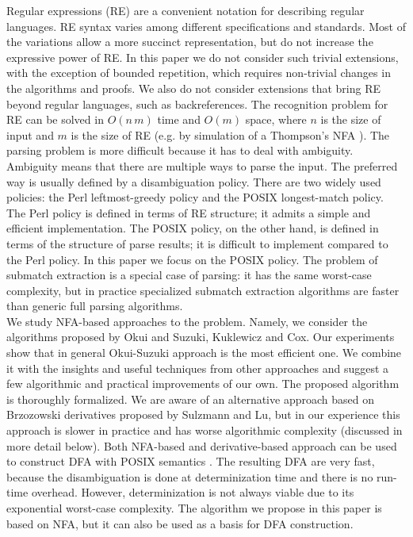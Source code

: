 \documentclass[AMA,STIX1COL]{WileyNJD-v2}
\begin{document}
Regular expressions (RE) are a convenient notation for describing regular languages.
RE syntax varies among different specifications and standards.
Most of the variations allow a more succinct representation, but do not increase the expressive power of RE.
In this paper we do not consider such trivial extensions, with the exception of bounded repetition,
which requires non-trivial changes in the algorithms and proofs.
We also do not consider extensions that bring RE beyond regular languages, such as backreferences.
%
The recognition problem for RE can be solved in $O(n \, m)$ time and $O(m)$ space,
where $n$ is the size of input and $m$ is the size of RE
(e.g. by simulation of a Thompson's NFA \cite{Tho68} \cite{ALSU07}).
The parsing problem is more difficult because it has to deal with ambiguity.
Ambiguity means that there are multiple ways to parse the input.
The preferred way is usually defined by a disambiguation policy.
There are two widely used policies: the Perl leftmost-greedy policy and the POSIX longest-match policy.
The Perl policy is defined in terms of RE structure; it admits a simple and efficient implementation.
The POSIX policy, on the other hand, is defined in terms of the structure of parse results;
it is difficult to implement compared to the Perl policy.
In this paper we focus on the POSIX policy.
%
The problem of submatch extraction is a special case of parsing: it has the same worst-case complexity,
but in practice specialized submatch extraction algorithms are faster than generic full parsing algorithms.
\\

We study NFA-based approaches to the problem.
Namely, we consider the algorithms proposed by Okui and Suzuki\cite{OS13}, Kuklewicz\cite{Kuk07} and Cox\cite{Cox09}.
Our experiments show that in general Okui-Suzuki approach is the most efficient one.
We combine it with the insights and useful techniques from other approaches
and suggest a few algorithmic and practical improvements of our own.
The proposed algorithm is thoroughly formalized.
%
We are aware of an alternative approach based on Brzozowski derivatives proposed by Sulzmann and Lu\cite{SL14},
but in our experience this approach is slower in practice and has worse algorithmic complexity (discussed in more detail below).
%
Both NFA-based and derivative-based approach can be used to construct DFA with POSIX semantics \cite{SL13} \cite{Bor15} \cite{Tro17}.
The resulting DFA are very fast, because the disambiguation is done at determinization time and there is no run-time overhead.
However, determinization is not always viable due to its exponential worst-case complexity.
The algorithm we propose in this paper is based on NFA, but it can also be used as a basis for DFA construction.
\\
\end{document}
